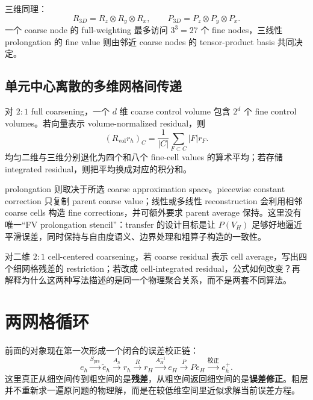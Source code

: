 三维同理：
\begin{equation}
R_{3D}=R_z\otimes R_y\otimes R_x,
\qquad
P_{3D}=P_z\otimes P_y\otimes P_x.
\label{eq:twogrid-three-dimensional-transfer-tensor}
\end{equation}
一个 coarse node 的 full-weighting 最多访问 $3^3=27$ 个 fine nodes，三线性 prolongation 的 fine value 则由邻近 coarse nodes 的 tensor-product basis 共同决定。

\subsection{单元中心离散的多维网格间传递}

对 $2{:}1$ full coarsening，一个 $d$ 维 coarse control volume 包含 $2^d$ 个 fine control volumes。若向量表示 volume-normalized residual，则
\begin{equation}
(R_{\mathrm{vol}}r_h)_C
=\frac1{|C|}\sum_{F\subset C}|F|r_F.
\label{eq:twogrid-cell-centered-multidim-restriction}
\end{equation}
均匀二维与三维分别退化为四个和八个 fine-cell values 的算术平均；若存储 integrated residual，则把平均换成对应的积分和。

prolongation 则取决于所选 coarse approximation space。piecewise constant correction 只复制 parent coarse value；线性或多线性 reconstruction 会利用相邻 coarse cells 构造 fine corrections，并可额外要求 parent average 保持。这里没有唯一“FV prolongation stencil”：transfer 的设计目标是让 $P(V_H)$ 足够好地逼近平滑误差，同时保持与自由度语义、边界处理和粗算子构造的一致性。

\begin{checkpointbox}
对二维 $2{:}1$ cell-centered coarsening，若 coarse residual 表示 cell average，写出四个细网格残差的 restriction；若改成 cell-integrated residual，公式如何改变？再解释为什么这两种写法描述的是同一个物理聚合关系，而不是两套不同算法。
\end{checkpointbox}

\section{两网格循环}
\label{sec:two-grid-cycle}

前面的对象现在第一次形成一个闭合的误差校正链：
\begin{equation}
\boxed{
e_h
\xrightarrow{S_{\mathrm{pre}}}
\widetilde e_h
\xrightarrow{A_h}
r_h
\xrightarrow{R}
r_H
\xrightarrow{A_H^{-1}}
e_H
\xrightarrow{P}
Pe_H
\xrightarrow{\text{校正}}
e_h^+.
}
\label{eq:twogrid-error-correction-chain}
\end{equation}
这里真正从细空间传到粗空间的是\textbf{残差}，从粗空间返回细空间的是\textbf{误差修正}。粗层并不重新求一遍原问题的物理解，而是在较低维空间里近似求解当前误差方程。

